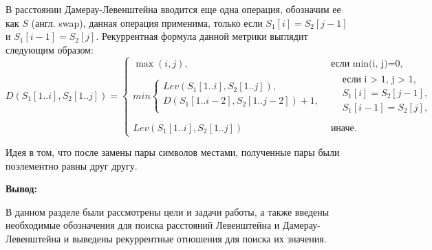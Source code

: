 В расстоянии Дамерау-Левенштейна вводится еще одна операция, обозначим ее как $S$ (англ. swap), данная операция применима, только  если $S_{1}[i] = S_{2}[j - 1]$
и $S_{1}[i - 1] = S_{2}[j]$. Рекуррентная формула  данной метрики выглядит следующим образом:
\small
\begin{equation}
	\label{eq:DL}
	D(S_{1}[1..i],S_{2}[1..j]) = 
	\begin{cases}
		\max(i,j), &\text{если min(i, j)=0,}\\
		min \begin{cases}
			Lev(S_{1}[1..i],S_{2}[1..j]),\\
			D(S_{1}[1..i - 2],S_{2}[1..j - 2]) + 1, \\
		\end{cases}
		& \begin{aligned}
			& \text{если i > 1, j > 1}, \\
			& S_{1}[i] = S_{2}[j - 1], \\
			& S_{1}[i - 1] = S_{2}[j], \\
		\end{aligned}\\
		Lev(S_{1}[1..i],S_{2}[1..j])
		 & \text{иначе.}
	\end{cases}
\end{equation}

Идея в том, что после замены пары символов местами, полученные пары были поэлементно равны друг другу.

\textbf{Вывод:}

В данном разделе были рассмотрены цели и задачи работы, а также введены необходимые обозначения для поиска расстояний Левенштейна и Дамерау-Левенштейна
и выведены рекуррентные отношения для поиска их значения.

